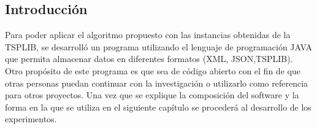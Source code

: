 \subsection{Introducción}
 Para poder aplicar el algoritmo propuesto con las instancias obtenidas de la TSPLIB, se desarrolló un programa utilizando el lenguaje de programación JAVA que permita almacenar datos en diferentes formatos (XML, JSON,TSPLIB).\\
 \hspace*{1cm}Otro propósito de este programa es que sea de código abierto con el fin de que otras personas puedan continuar con la investigación o utilizarlo como referencia para otros proyectos. Una vez que se explique la composición del software y la forma en la que se utiliza en el siguiente capítulo se procederá al desarrollo de los experimentos.\\
 
